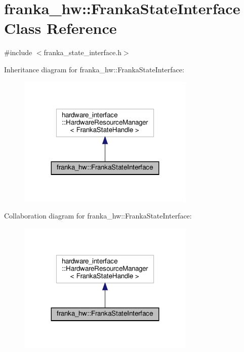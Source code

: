 \hypertarget{classfranka__hw_1_1_franka_state_interface}{}\section{franka\+\_\+hw\+:\+:Franka\+State\+Interface Class Reference}
\label{classfranka__hw_1_1_franka_state_interface}


{\ttfamily \#include $<$franka\+\_\+state\+\_\+interface.\+h$>$}



Inheritance diagram for franka\+\_\+hw\+:\+:Franka\+State\+Interface\+:
\nopagebreak
\begin{figure}[H]
\begin{center}
\leavevmode
\includegraphics[width=239pt]{classfranka__hw_1_1_franka_state_interface__inherit__graph}
\end{center}
\end{figure}


Collaboration diagram for franka\+\_\+hw\+:\+:Franka\+State\+Interface\+:
\nopagebreak
\begin{figure}[H]
\begin{center}
\leavevmode
\includegraphics[width=239pt]{classfranka__hw_1_1_franka_state_interface__coll__graph}
\end{center}
\end{figure}


